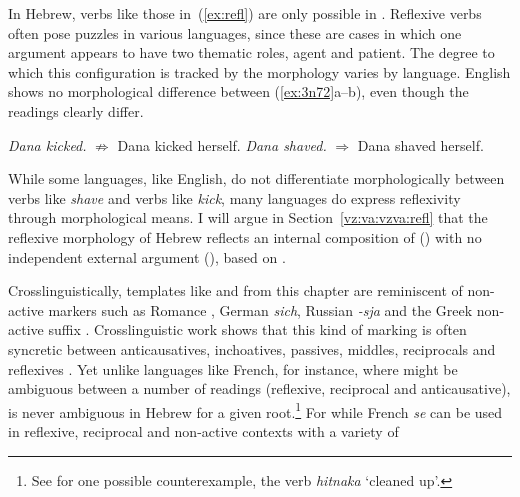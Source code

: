 \begin{exe}
\begin{xlist}
\begin{xlist}
\begin{exe}
\begin{xlist}
\begin{xlist}
\begin{exe}
\begin{xlist}
\begin{xlist}
\begin{exe}
\begin{exe}
\begin{xlist}
\begin{exe}
\begin{exe}
\begin{xlist}
\begin{exe}
\begin{exe}
\begin{exe}
\begin{exe}
\begin{exe}
\begin{xlist}
\begin{exe}
\begin{xlist}
\begin{exe}
\begin{exe}
\begin{xlist}
\begin{exe}
\begin{xlist}
\begin{exe}
\begin{xlist}
\begin{exe}
\begin{exe}
\begin{exe}
\begin{xlist}
\begin{exe}
\begin{exe}
\begin{exe}
\begin{xlist}
\begin{exe}
\begin{xlist}
\begin{exe}
\begin{xlist}
\begin{exe}
\begin{xlist}
\begin{exe}
\begin{exe}
\begin{exe}
\begin{exe}
\begin{xlist}
\begin{exe}
\begin{xlist}
\begin{exe}
\begin{xlist}
\begin{exe}
\begin{xlist}
\begin{exe}
\begin{xlist}
\begin{exe}
\begin{xlist}
\begin{exe}
\begin{exe}
\begin{exe}
\begin{exe}
\begin{xlist}
\begin{exe}
\begin{xlist}
\begin{exe}
\begin{xlist}
\begin{exe}
\begin{exe}
\begin{xlist}
\begin{exe}
\begin{xlist}
\begin{exe}
\begin{exe}
\begin{exe}
\begin{exe}
\begin{xlist}
\begin{xlist}
\begin{exe}
\begin{xlist}
\begin{exe}
\begin{exe}
\begin{exe}
\begin{xlist}
\begin{exe}
\begin{exe}
\begin{xlist}
\begin{exe}
\begin{exe}
\begin{exe}
\begin{xlist}
\begin{xlist}
In Hebrew, verbs like those in~(\ref{ex:refl}) are only possible in {\thit}. Reflexive verbs often pose puzzles in various languages, since these are cases in which one argument appears to have two thematic roles, agent and patient. The degree to which this configuration is tracked by the morphology varies by language. English shows no morphological difference between (\ref{ex:3n72}a--b), even though the readings clearly differ.
 \begin{exe}
 \ex  \label{ex:3n72}
 \begin{xlist} 
 	\ex \emph{Dana kicked.} 
		$\nRightarrow$ Dana kicked herself.
 	\ex  \emph{Dana shaved.} 
		$\Rightarrow$ Dana shaved herself.
 \z
\z 

While some languages, like English, do not differentiate morphologically between verbs like \emph{shave} and verbs like \emph{kick}, many languages do express reflexivity through morphological means. I will argue in Section~\ref{vz:va:vzva:refl} that the reflexive morphology of Hebrew reflects an internal composition of  (\va) with no independent external argument (\vz), based on \cite{kastner17gjgl}.

Crosslinguistically, templates like {\tnif} and {\thit} from this chapter are reminiscent of non-active markers such as Romance , German \emph{sich}, Russian \emph{-sja} and the Greek non-active suffix . Crosslinguistic work shows that this kind of marking is often syncretic between anticausatives, inchoatives, passives, middles, reciprocals and reflexives \citep{geniusiene87,klaiman91,alexiadoudoron12,kastnerzu17}. Yet unlike languages like French, for instance, where  might be ambiguous between a number of readings (reflexive, reciprocal and anticausative), {\thit} is never ambiguous in Hebrew for a given root.\footnote{See \cite{kastner17gjgl} for one possible counterexample, the verb \emph{hitnaka} `cleaned up'.} For while French \emph{se} can be used in reflexive, reciprocal and non-active contexts with a variety of 
\end{xlist}
\end{exe}
\end{xlist}
\end{xlist}
\end{exe}
\end{exe}
\end{exe}
\end{xlist}
\end{exe}
\end{exe}
\end{xlist}
\end{exe}
\end{exe}
\end{exe}
\end{xlist}
\end{exe}
\end{xlist}
\end{xlist}
\end{exe}
\end{exe}
\end{exe}
\end{exe}
\end{xlist}
\end{exe}
\end{xlist}
\end{exe}
\end{exe}
\end{xlist}
\end{exe}
\end{xlist}
\end{exe}
\end{xlist}
\end{exe}
\end{exe}
\end{exe}
\end{exe}
\end{xlist}
\end{exe}
\end{xlist}
\end{exe}
\end{xlist}
\end{exe}
\end{xlist}
\end{exe}
\end{xlist}
\end{exe}
\end{xlist}
\end{exe}
\end{exe}
\end{exe}
\end{exe}
\end{xlist}
\end{exe}
\end{xlist}
\end{exe}
\end{xlist}
\end{exe}
\end{xlist}
\end{exe}
\end{exe}
\end{exe}
\end{xlist}
\end{exe}
\end{exe}
\end{exe}
\end{xlist}
\end{exe}
\end{xlist}
\end{exe}
\end{xlist}
\end{exe}
\end{exe}
\end{xlist}
\end{exe}
\end{xlist}
\end{exe}
\end{exe}
\end{exe}
\end{exe}
\end{exe}
\end{xlist}
\end{exe}
\end{exe}
\end{xlist}
\end{exe}
\end{exe}
\end{xlist}
\end{xlist}
\end{exe}
\end{xlist}
\end{xlist}
\end{exe}
\end{xlist}
\end{xlist}
\end{exe}

